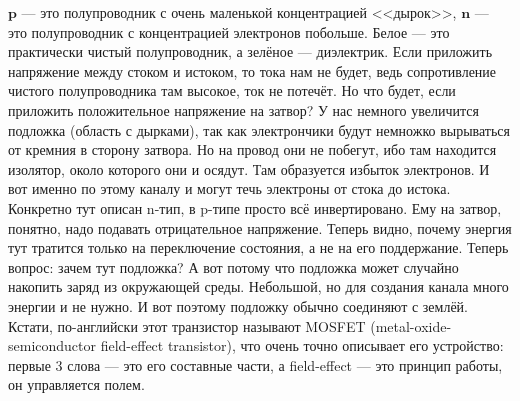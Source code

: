 \documentclass{article}
\begin{document}
    $\mathbf p$ --- это полупроводник с очень маленькой концентрацией <<дырок>>, $\mathbf n$ --- это полупроводник с концентрацией электронов побольше. Белое --- это практически чистый полупроводник, а зелёное --- диэлектрик. Если приложить напряжение между стоком и истоком, то тока нам не будет, ведь сопротивление чистого полупроводника там высокое, ток не потечёт. Но что будет, если приложить положительное напряжение на затвор? У нас немного увеличится подложка (область с дырками), так как электрончики будут немножко вырываться от кремния в сторону затвора. Но на провод они не побегут, ибо там находится изолятор, около которого они и осядут. Там образуется избыток электронов. И вот именно по этому каналу и могут течь электроны от стока до истока. Конкретно тут описан n-тип, в p-типе просто всё инвертировано. Ему на затвор, понятно, надо подавать отрицательное напряжение. Теперь видно, почему энергия тут тратится только на переключение состояния, а не на его поддержание. Теперь вопрос: зачем тут подложка? А вот потому что подложка может случайно накопить заряд из окружающей среды. Небольшой, но для создания канала много энергии и не нужно. И вот поэтому подложку обычно соединяют с землёй.
    Кстати, по-английски этот транзистор называют MOSFET (metal-oxide-semiconductor field-effect transistor), что очень точно описывает его устройство: первые 3 слова --- это его составные части, а field-effect --- это принцип работы, он управляется полем.
\end{document}
